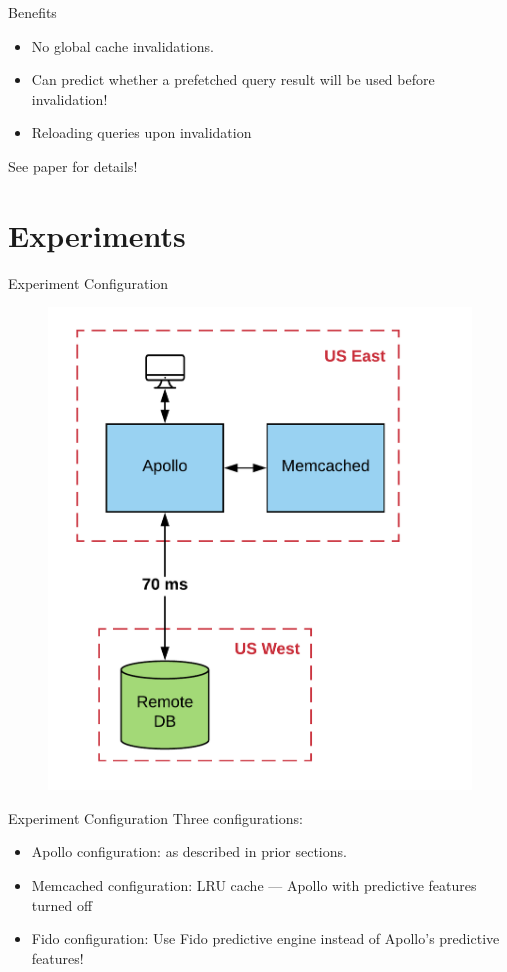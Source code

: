 \documentclass[10pt]{beamer}
\begin{document}
\begin{frame}[fragile]{Benefits}
    \begin{itemize}
        \item{No global cache invalidations.}
        \item{Can predict whether a prefetched query result will be used before invalidation!}
        \item{Reloading queries upon invalidation}
    \end{itemize}
   \alert{See paper for details!}
\end{frame}

\section{Experiments}

\begin{frame}[fragile]{Experiment Configuration}
    \begin{figure}
        \center
        \includegraphics[scale=0.17]{apollo_exp_config}
    \end{figure}
\end{frame}

\begin{frame}[fragile]{Experiment Configuration}
    Three configurations:
    \begin{itemize}
        \item{\alert{Apollo configuration:} as described in prior sections.}
        \item{\alert{Memcached configuration:} LRU cache --- Apollo with predictive features turned off}
        \item{\alert{Fido configuration:} Use Fido predictive engine instead of Apollo's predictive features!}
    \end{itemize}
\end{frame}
\end{document}
